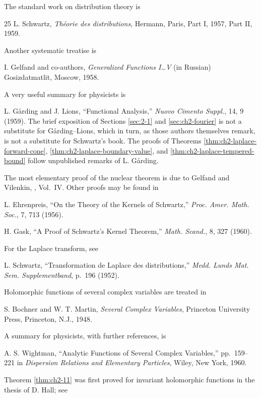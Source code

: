 \chapterbibliography

The standard work on distribution theory is

\begin{thebibliography}{25}\small
{}
L. Schwartz, \emph{Th\'eorie des distributions}, Hermann, Paris, Part I,
1957, Part II, 1959.

Another systematic treatise is

I. Gelfand and co-authors, \emph{Generalized Functions I\ldots V} (in
Russian) Gosizdatmatlit, Moscow, 1958.

A very useful summary for physicists is

L. G\aa rding and J. Lions, ``Functional Analysis,'' \emph{Nuovo Cimento
Suppl.}, 14, 9 (1959).  The brief exposition of Sections \ref{sec:2-1} and \ref{sec:ch2-fourier} is not
a substitute for G\aa rding--Lions, which in turn, as those authors themselves
remark, is not a substitute for Schwartz's book.  The proofs of Theorems
\ref{thm:ch2-laplace-forward-cone}, \ref{thm:ch2-laplace-boundary-value}, and
\ref{thm:ch2-laplace-tempered-bound} follow unpublished remarks of L. G\aa rding.

The most elementary proof of the nuclear theorem is due to Gelfand and
Vilenkin, \cite{pct-2}, Vol.~IV. Other proofs may be found in

L. Ehrenpreis, ``On the Theory of the Kernels of Schwartz,'' \emph{Proc.
Amer. Math. Soc.}, 7, 713 (1956).

H. Gask, ``A Proof of Schwartz's Kernel Theorem,'' \emph{Math. Scand.}, 8,
327 (1960).

For the Laplace transform, see

L. Schwartz, ``Transformation de Laplace des distributions,'' \emph{Medd.
Lunds Mat. Sem. Supplementband}, p.~196 (1952).

Holomorphic functions of several complex variables are treated in

S. Bochner and W. T. Martin, \emph{Several Complex Variables}, Princeton
University Press, Princeton, N.J., 1948.

A summary for physicists, with further references, is

A. S. Wightman, ``Analytic Functions of Several Complex Variables,'' pp.~159--221
in \emph{Dispersion Relations and Elementary Particles}, Wiley, New York,
1960.

Theorem \ref{thm:ch2-11} was first proved for invariant holomorphic functions in the
thesis of D. Hall; see


\end{thebibliography}
